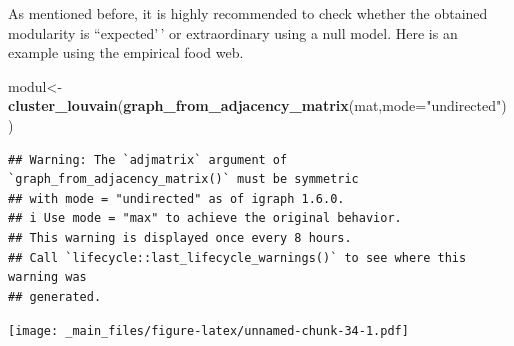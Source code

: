 \documentclass[
]{book}
\newenvironment{Shaded}{\begin{snugshade}}{\end{snugshade}}
\newcommand{\AttributeTok}[1]{\textcolor[rgb]{0.13,0.29,0.53}{#1}}
\newcommand{\ControlFlowTok}[1]{\textcolor[rgb]{0.13,0.29,0.53}{\textbf{#1}}}
\newcommand{\DecValTok}[1]{\textcolor[rgb]{0.00,0.00,0.81}{#1}}
\newcommand{\FunctionTok}[1]{\textcolor[rgb]{0.13,0.29,0.53}{\textbf{#1}}}
\newcommand{\NormalTok}[1]{#1}
\newcommand{\OtherTok}[1]{\textcolor[rgb]{0.56,0.35,0.01}{#1}}
\newcommand{\SpecialCharTok}[1]{\textcolor[rgb]{0.81,0.36,0.00}{\textbf{#1}}}
\newcommand{\StringTok}[1]{\textcolor[rgb]{0.31,0.60,0.02}{#1}}
\theoremstyle{definition}
\theoremstyle{definition}
\theoremstyle{definition}
\theoremstyle{definition}
\theoremstyle{remark}
\begin{document}
As mentioned before, it is highly recommended to check whether the obtained modularity is ``expected'\,' or extraordinary using a null model. Here is an example using the empirical food web.

\begin{Shaded}
\begin{Highlighting}[]
\NormalTok{modul}\OtherTok{\textless{}{-}}\FunctionTok{cluster\_louvain}\NormalTok{(}\FunctionTok{graph\_from\_adjacency\_matrix}\NormalTok{(mat,}\AttributeTok{mode=}\StringTok{"undirected"}\NormalTok{))}
\end{Highlighting}
\end{Shaded}

\begin{verbatim}
## Warning: The `adjmatrix` argument of `graph_from_adjacency_matrix()` must be symmetric
## with mode = "undirected" as of igraph 1.6.0.
## i Use mode = "max" to achieve the original behavior.
## This warning is displayed once every 8 hours.
## Call `lifecycle::last_lifecycle_warnings()` to see where this warning was
## generated.
\end{verbatim}

\begin{Shaded}
\end{Shaded}

\texttt{[image: \_main\_files/figure-latex/unnamed-chunk-34-1.pdf]}

\begin{Shaded}
\end{Shaded}
\end{document}
